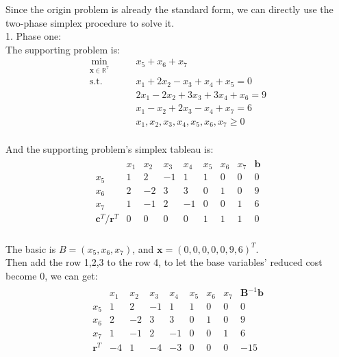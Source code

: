 \documentclass[10pt]{article}
\renewcommand{\mathbf}{\boldsymbol}
\begin{document}
Since the origin problem is already the standard form, we can directly use the two-phase simplex procedure to solve it.\\
1. Phase one:\\
The supporting problem is:\\
\begin{equation}
	\begin{aligned}
		\min_{\bm{x} \in \mathbb{R}^{7}}\qquad & x_5 + x_6 + x_7 \\
		\mathrm{s.t.}\qquad & x_{1} + 2x_{2} - x_{3} + x_{4} + x_5 = 0 \\
							& 2x_{1} - 2x_{2} + 3x_{3} + 3x_{4} + x_6 = 9 \\
							& x_{1} - x_{2} + 2x_{3} - x_{4} + x_7 = 6 \\
							& x_{1}, x_{2}, x_{3}, x_{4}, x_5, x_6, x_7 \geq 0 \\
	\end{aligned}
\end{equation}

And the supporting problem's simplex tableau is:\\
\begin{equation}
	\begin{aligned}
		\begin{array}{c|ccccccc|c}
			& x_1 & x_2 & x_3 & x_4 & x_5 & x_6 & x_7 & \mathbf{b} \\
			\hline
			x_5 & 1 & 2 & -1 & 1 & 1 & 0 & 0 & 0 \\
			x_6 & 2 & -2 & 3 & 3 & 0 & 1 & 0 & 9 \\
			x_7 & 1 & -1 & 2 & -1 & 0 & 0 & 1 & 6 \\
			\hline
			\mathbf{c}^T/\mathbf{r}^T & 0 & 0 & 0 & 0 & 1 & 1 & 1 & 0 \\
		\end{array}
	\end{aligned}
\end{equation}

The basic is $B=(x_5,x_6,x_7)$, and $\mathbf{x}=(0,0,0,0,0,9,6)^T$.\\
Then add the row 1,2,3 to the row 4, to let the base variables' reduced cost become $0$, we can get:\\
\begin{equation}
	\begin{aligned}
		\begin{array}{c|ccccccc|c}
			& x_1 & x_2 & x_3 & x_4 & x_5 & x_6 & x_7 & \mathbf{B}^{-1}\mathbf{b} \\
			\hline
			x_5 & \boxed{1} & 2 & -1 & 1 & 1 & 0 & 0 & 0 \\
			x_6 & 2 & -2 & 3 & 3 & 0 & 1 & 0 & 9 \\
			x_7 & 1 & -1 & 2 & -1 & 0 & 0 & 1 & 6 \\
			\hline
			\mathbf{r}^T & -4 & 1 & -4 & -3 & 0 & 0 & 0 & -15 \\
		\end{array}
	\end{aligned}
\end{equation}
\end{document}
